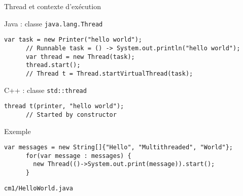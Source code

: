 
\begingroup

\begin{frame}[fragile]{Thread et contexte d'exécution}

  \begin{block}{Java : classe \lstinline{java.lang.Thread}}
    \begin{lstlisting}[gobble=6]
      var task = new Printer("hello world");
      // Runnable task = () -> System.out.println("hello world");
      var thread = new Thread(task);
      thread.start();
      // Thread t = Thread.startVirtualThread(task); 
    \end{lstlisting}
  \end{block}

  \begin{block}{C++ : classe \lstinline{std::thread}}
    \begin{lstlisting}[gobble=6]
      thread t(printer, "hello world");
      // Started by constructor
    \end{lstlisting}
  \end{block}

  \begin{exampleblock}{Exemple}
    \begin{lstlisting}[gobble=6]
      var messages = new String[]{"Hello", "Multithreaded", "World"};
      for(var message : messages) {
        new Thread(()->System.out.print(message)).start();
      }
    \end{lstlisting}
  \end{exampleblock}

  \begin{citing}
    \jitem \lstinline{cm1/HelloWorld.java}
  \end{citing}

\end{frame}

\endgroup
\endinput

